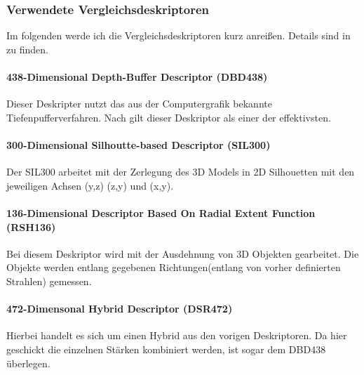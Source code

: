 
\subsubsection{Verwendete Vergleichsdeskriptoren}
Im folgenden werde ich die Vergleichsdeskriptoren kurz anreißen. Details sind in \cite{dvvra3DModelret} zu finden.

\paragraph{438-Dimensional Depth-Buffer Descriptor (DBD438)}
Dieser Deskripter nutzt das aus der Computergrafik bekannte Tiefenpufferverfahren. Nach \cite{scherer2010histograms} gilt dieser Deskriptor als einer der effektivsten.

\paragraph{300-Dimensional Silhoutte-based Descriptor (SIL300)}
Der SIL300 arbeitet mit der Zerlegung des 3D Models in 2D Silhouetten 
mit den jeweiligen Achsen (y,z) (z,y) und (x,y).

\paragraph{136-Dimensional Descriptor Based On Radial Extent Function (RSH136)}
Bei diesem Deskriptor wird mit der Ausdehnung von 3D Objekten gearbeitet. Die Objekte werden entlang gegebenen Richtungen(entlang von vorher definierten Strahlen) gemessen.

\paragraph{472-Dimensonal Hybrid Descriptor (DSR472)}
Hierbei handelt es sich um einen Hybrid aus den vorigen Deskriptoren. Da hier geschickt die einzelnen Stärken kombiniert werden, ist sogar dem DBD438 überlegen.

